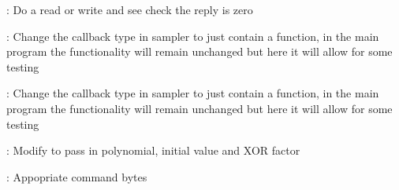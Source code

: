 
\begin{DoxyRefList}
\item[\label{todo__todo000004}%
\Hypertarget{todo__todo000004}%
Member \hyperlink{DriverSensorTest_8cpp_a0d54f5e177d12a6c804fa4396c287cae}{B\+O\+O\+S\+T\+\_\+\+A\+U\+T\+O\+\_\+\+T\+E\+S\+T\+\_\+\+C\+A\+SE} (I2\+C\+\_\+\+P\+L\+A\+I\+N\+\_\+\+W\+R\+I\+T\+E\+\_\+\+R\+E\+AD)]\+: Do a read or write and see check the reply is zero 
\item[\label{todo__todo000006}%
\Hypertarget{todo__todo000006}%
Member \hyperlink{IntegrationTests_8cpp_ad22d36c43a840b4967715d65fd1da45f}{B\+O\+O\+S\+T\+\_\+\+A\+U\+T\+O\+\_\+\+T\+E\+S\+T\+\_\+\+C\+A\+SE} (C\+O\+N\+T\+R\+O\+L\+L\+E\+R\+\_\+\+E\+V\+E\+N\+T\+\_\+\+H\+A\+N\+D\+L\+ER)]\+: Change the callback type in sampler to just contain a function, in the main program the functionality will remain unchanged but here it will allow for some testing 
\item[\label{todo__todo000005}%
\Hypertarget{todo__todo000005}%
Member \hyperlink{IntegrationTests_8cpp_adc1d3c8e593faa9c35d22df377ba1a08}{B\+O\+O\+S\+T\+\_\+\+A\+U\+T\+O\+\_\+\+T\+E\+S\+T\+\_\+\+C\+A\+SE} (I2\+C\+\_\+\+S\+A\+M\+P\+L\+E\+R\+\_\+\+R\+E\+AD)]\+: Change the callback type in sampler to just contain a function, in the main program the functionality will remain unchanged but here it will allow for some testing 
\item[\label{todo__todo000003}%
\Hypertarget{todo__todo000003}%
Member \hyperlink{utils_8h_a382a50931a510e3f93461c289586dfd6}{C\+R\+C8} (uint8\+\_\+t $\ast$data, uint8\+\_\+t datalen)]\+: Modify to pass in polynomial, initial value and X\+OR factor  
\item[\label{todo__todo000001}%
\Hypertarget{todo__todo000001}%
Member \hyperlink{classI2CDriver_a732c5b799a0aecde0d908ee981872572}{I2\+C\+Driver\+:\+:Plain\+\_\+\+I2\+C\+\_\+\+Write\+\_\+\+Read\+\_\+\+C\+R\+C8} (int fd, uint16\+\_\+t command, uint16\+\_\+t $\ast$buffer, uint8\+\_\+t readlen, uint16\+\_\+t delay=10)]\+: Appopriate command bytes 
\end{DoxyRefList}